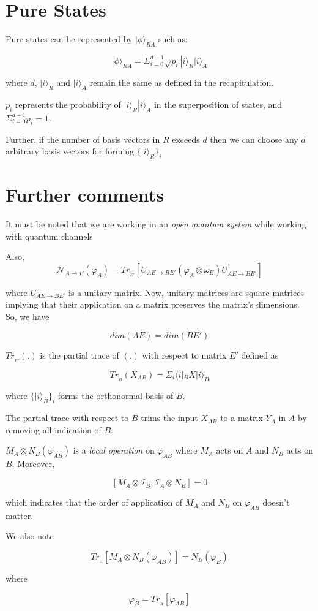 \documentclass{article}
\begin{document}
\section{Pure States}

Pure states can be represented by $| \phi \rangle _{RA}$ such as:

\[| \phi \rangle _{RA} = \Sigma^{d-1}_{i=0} \sqrt{p_i}| i \rangle_R | i \rangle_A \]

where $d$, $| i \rangle_R$ and $| i \rangle_A$ remain the same as defined in the recapitulation. 

$p_i$ represents the probability of $| i \rangle_R | i \rangle_A$ in the superposition of states, and $\Sigma^{d-1}_{i=0} {p_i} = 1$.

\noindent Further, if the number of basis vectors in $R$ exceeds $d$ then we can choose any $d$ arbitrary basis vectors for forming 
$\{| i \rangle_R \}_i$

\section{Further comments}

\begin{description}

\item It must be noted that we are working in an \emph{open quantum system} while working with quantum channels

\item Also,
\[ \mathcal{N}_{A \rightarrow B}(\varphi_A) = Tr_{_{E'}}[U_{AE \rightarrow BE'} (\varphi_A \otimes \omega_E) U_{AE \rightarrow BE'}^{\dagger} ]\]

where $U_{AE \rightarrow BE'}$ is a unitary matrix. Now, unitary matrices are square matrices implying that their application on a matrix preserves the matrix's dimensions. So, we have

\[dim(AE) = dim(BE')\]

$Tr_{_{E'}}(.)$ is the partial trace of $(.)$ with respect to matrix $E'$ defined as

\[ Tr_{_{B}}(X_{AB}) = \Sigma_i \langle i |_{B} X | i \rangle_{B} \]

where $\{ | i \rangle_{B} \}_i$ forms the orthonormal basis of $B$.

The partial trace with respect to $B$ trims the input $X_{AB}$ to a matrix $Y_A$ in $A$ by removing all indication of $B$.

\item $M_A \otimes N_B (\varphi_{AB})$  is a \emph{local operation} on $\varphi_{AB}$ where $M_A$ acts on $A$ and $N_B$ acts on $B$. Moreover, 

\[ [ M_A \otimes \mathcal{I}_B, \mathcal{I}_A \otimes N_B ] = 0 \]

which indicates that the order of application of $M_A$ and $N_B$ on $\varphi_{AB}$ doesn't matter.

\item We also note

\[ Tr_{_A}[M_A \otimes N_B (\varphi_{AB})] = N_B(\varphi_B) \]

where 

\[ \varphi_B = Tr_{_A}[\varphi_{AB}] \]

\end{description}
\end{document}
